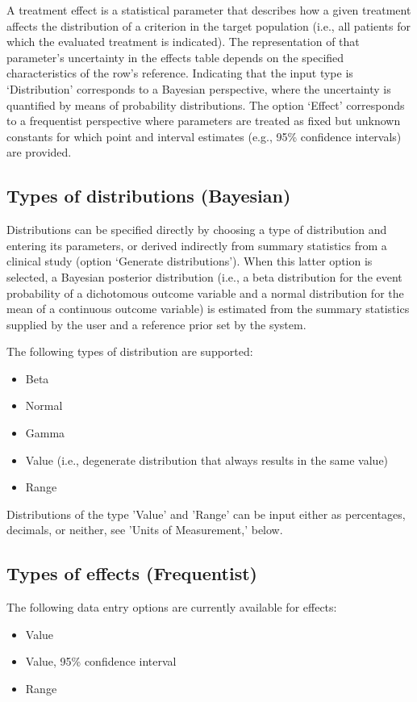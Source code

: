 \documentclass[00_mcda_tutorial.tex]{subfiles}
\begin{document}
A treatment effect is a statistical parameter that describes how a given treatment affects the distribution of a criterion in the target population (i.e., all patients for which the evaluated treatment is indicated). The representation of that parameter’s uncertainty in the effects table depends on the specified characteristics of the row’s reference. Indicating that the input type is ‘Distribution’ corresponds to a Bayesian perspective, where the uncertainty is quantified by means of probability distributions. The option ‘Effect’ corresponds to a frequentist perspective where parameters are treated as fixed but unknown constants for which point and interval estimates (e.g., 95\% confidence intervals) are provided.

\subsection*{Types of distributions (Bayesian)}
Distributions can be specified directly by choosing a type of distribution and entering its parameters, or derived indirectly from summary statistics from a clinical study (option ‘Generate distributions’). When this latter option is selected, a Bayesian posterior distribution (i.e., a beta distribution for the event probability of a dichotomous outcome variable and a normal distribution for the mean of a continuous outcome variable) is estimated from the summary statistics supplied by the user and a reference prior set by the system.
\newline

\noindent The following types of distribution are supported:
\begin{itemize}
    \item Beta
    \item Normal
    \item Gamma
    \item Value (i.e., degenerate distribution that always results in the same value)
    \item Range
\end{itemize}

\noindent Distributions of the type 'Value' and 'Range' can be input either as percentages, decimals, or neither, see 'Units of Measurement,' below.

\subsection*{Types of effects (Frequentist)}
The following data entry options are currently available for effects:
\begin{itemize}
    \item Value
    \item Value, 95\% confidence interval
    \item Range
\end{itemize}
\end{document}
